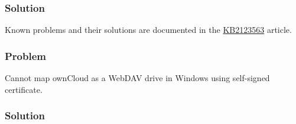 \documentclass[letterpaper,10pt,english]{sphinxmanual}
\begin{document}
\subsubsection{Solution}
\label{files/access_webdav:id7}
Known problems and their solutions are documented in the \href{https://support.microsoft.com/kb/2123563}{KB2123563} article.


\subsubsection{Problem}
\label{files/access_webdav:id8}
Cannot map ownCloud as a WebDAV drive in Windows using self-signed certificate.


\subsubsection{Solution}
\end{document}
